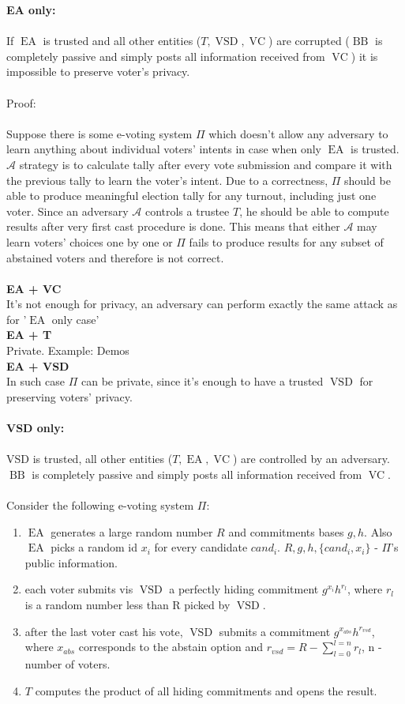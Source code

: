 \documentclass[12pt]{article}
\DeclareMathOperator{\vsd}{VSD}
\DeclareMathOperator{\ea}{EA}
\DeclareMathOperator{\bb}{BB}
\DeclareMathOperator{\voc}{VC}
\begin{document}
\textbf{EA only:}\\\\
If $\ea$ is trusted and all other entities ($T,\vsd,\voc$) are corrupted ($\bb$ is completely passive and simply posts all information received from $\voc$) it is impossible to preserve voter's privacy. \\\\
Proof:\\\\
Suppose there is some e-voting system $\Pi$ which doesn't allow any adversary to learn anything about individual voters' intents in case when only $\ea$ is trusted. $\mathcal{A}$ strategy is to calculate tally after every vote submission and compare it with the previous tally to learn the voter's intent. Due to a correctness, $\Pi$ should be able to produce meaningful election tally for any turnout, including just one voter. Since an adversary $\mathcal{A}$ controls a trustee $T$, he should be able to compute results after very first cast procedure is done. This means that either $\mathcal{A}$  may learn voters' choices one by one or $\Pi$ fails to produce results for any subset of abstained voters  and therefore is not correct. \\\\
 \textbf{EA + VC}\\
 It's not enough for privacy, an adversary can perform exactly the same attack as for '$\ea$ only case'\\
 \textbf{EA + T}\\
Private. Example: Demos\\ 
 \textbf{EA + VSD}\\
 In such case $\Pi$ can be private, since it's enough to have a trusted $\vsd$ for preserving voters' privacy. \\\\
 \textbf{VSD only:}\\\\
 VSD is trusted, all other entities ($T,\ea,\voc$) are controlled by an adversary. $\bb$ is completely passive and simply posts all information received from $\voc$. \\\\
Consider the following e-voting system $\Pi$:
\begin{enumerate}
 \item $\ea$ generates a large random number $R$ and commitments bases $g,h$. Also $\ea$ picks a random id  $x_i$ for every candidate $cand_i$. $R,g,h, \{cand_i,x_i\}$  - $\Pi$'s public information. 
 \item each voter submits vis $\vsd$ a perfectly hiding commitment $g^{x_i}h^{r_l}$, where $r_l$ is a random number less than R picked by $\vsd$. 
 \item after the last voter cast his vote, $\vsd$ submits a commitment $g^{x_{abs}}h^{r_{vsd}}$, where $x_{abs}$ corresponds to the abstain option and $r_{vsd} = R - \sum_{l=0}^{l=n}r_l$, n - number of voters.  
 \item $T$ computes the product of all hiding commitments and opens the result.
 \end{enumerate}
\end{document}

